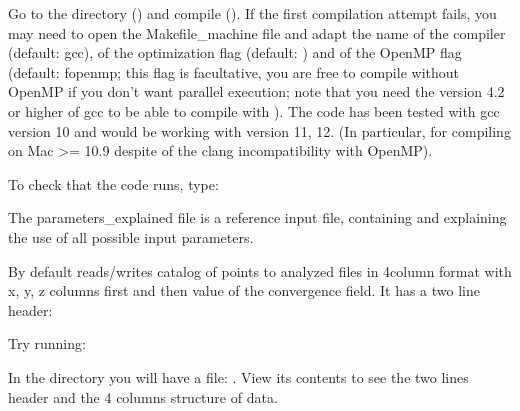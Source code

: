 \documentclass[letterpaper,10pt,english]{sphinxmanual}
\begin{document}
\sphinxAtStartPar
Go to the  directory () and compile (). If the first compilation attempt fails, you may need to open the Makefile\_machine file and adapt the name of the compiler (default: gcc), of the optimization flag (default: ) and of the OpenMP flag (default: \sphinxhyphen{}fopenmp; this flag is facultative, you are free to compile without OpenMP if you don’t want parallel execution; note that you need the version 4.2 or higher of gcc to be able to compile with ). The code has been tested with gcc version 10 and would be working with version 11, 12. (In particular, for compiling on Mac \textgreater{}= 10.9 despite of the clang incompatibility with OpenMP).

\sphinxAtStartPar
To check that the code runs, type:

\begin{sphinxVerbatim}[commandchars=\\\{\}]
 
 
\end{sphinxVerbatim}

\sphinxAtStartPar
The parameters\_explained file is a reference input file, containing and explaining the use of all possible input parameters.

\sphinxAtStartPar
By default  reads/writes catalog of points to analyzed files in 4\sphinxhyphen{}column format with x, y, z columns first and then value of the convergence field. It has a two line header:

\begin{sphinxVerbatim}[commandchars=\\\{\}]
\end{sphinxVerbatim}

\sphinxAtStartPar
Try running:

\begin{sphinxVerbatim}[commandchars=\\\{\}]
\end{sphinxVerbatim}

\sphinxAtStartPar
In the  directory you will have a file: . View its contents to see the two lines header and the 4 columns structure of data.
\end{document}
